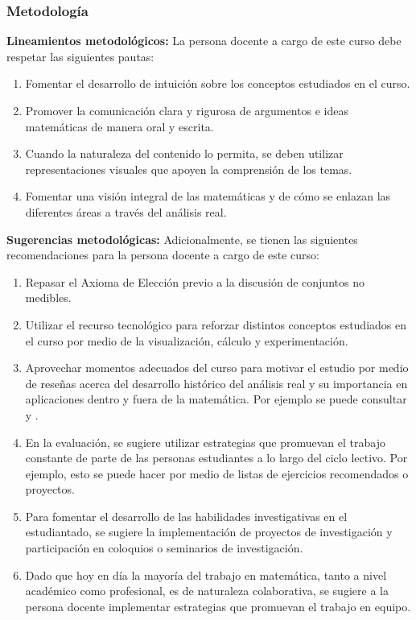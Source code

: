 \begin{refsection}
\begin{enumerate}
\end{enumerate}

\subsubsection*{Metodología}

\noindent \textbf{Lineamientos metodológicos:} La persona docente a cargo de este curso debe respetar las siguientes pautas:
\begin{enumerate}
    \item Fomentar el desarrollo de intuición sobre los conceptos estudiados en el curso. 
    \item Promover la comunicación clara y rigurosa de argumentos e ideas matemáticas de manera oral y escrita.
    \item Cuando la naturaleza del contenido lo permita, se deben utilizar representaciones visuales que apoyen la comprensión de los temas.
    \item Fomentar una visión integral de las matemáticas y de cómo se enlazan las diferentes áreas a través del análisis real.
\end{enumerate}

\textbf{Sugerencias metodológicas:} Adicionalmente, se tienen las siguientes recomendaciones para la persona docente a cargo de este curso:
\begin{enumerate}
    \item Repasar el Axioma de Elección previo a la discusión de conjuntos no medibles.
    \item Utilizar el recurso tecnológico para reforzar distintos conceptos estudiados en el curso por medio de la visualización, cálculo y experimentación.
    \item Aprovechar momentos adecuados del curso para motivar el estudio por medio de reseñas acerca del desarrollo histórico del análisis real y su importancia en aplicaciones dentro y fuera de la matemática. Por ejemplo se puede consultar \cite{Fol16} y \cite{Bre08}.
    \item En la evaluación, se sugiere utilizar estrategias que promuevan el trabajo constante de parte de las personas estudiantes a lo largo del ciclo lectivo. Por ejemplo, esto se puede hacer por medio de listas de ejercicios recomendados o proyectos.
    \item Para fomentar el desarrollo de las habilidades investigativas en el estudiantado, se sugiere la implementación de proyectos de investigación y participación en coloquios o seminarios de investigación.
    \item Dado que hoy en día la mayoría del trabajo en matemática, tanto a nivel académico como profesional, es de naturaleza colaborativa, se sugiere a la persona docente implementar estrategias que promuevan el trabajo en equipo.
\end{enumerate}




\end{refsection}
